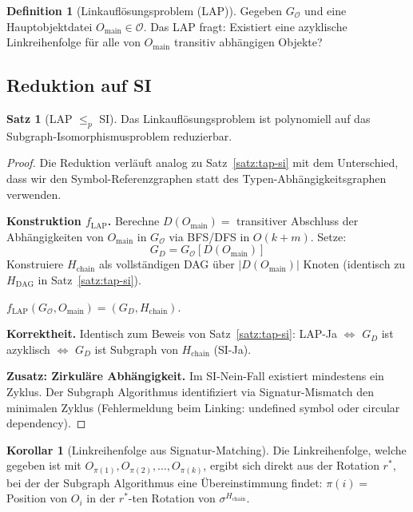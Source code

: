 ﻿\documentclass[a4paper,12pt]{article}
\theoremstyle{definition}
\newtheorem{definition}{Definition}
\newtheorem{satz}{Satz}
\newtheorem{korollar}{Korollar}
\begin{document}
\begin{definition}[Linkauflösungsproblem (LAP)]
\label{def:lap}
Gegeben $G_{\mathcal{O}}$ und eine Hauptobjektdatei $O_{\text{main}} \in \mathcal{O}$. Das LAP fragt: Existiert eine azyklische Linkreihenfolge für alle von $O_{\text{main}}$ transitiv abhängigen Objekte?
\end{definition}

\subsection{Reduktion auf SI}

\begin{satz}[LAP $\leq_p$ SI]
\label{satz:lap-si}
Das Linkauflösungsproblem ist polynomiell auf das Subgraph-Isomorphismusproblem reduzierbar.
\end{satz}

\begin{proof}
Die Reduktion verläuft analog zu Satz~\ref{satz:tap-si} mit dem Unterschied, dass wir den Symbol-Referenzgraphen statt des Typen-Abhängigkeitsgraphen verwenden.

\textbf{Konstruktion $f_{\text{LAP}}$.}
Berechne $D(O_{\text{main}}) = $ transitiver Abschluss der Abhängigkeiten von $O_{\text{main}}$ in $G_{\mathcal{O}}$ via BFS/DFS in $O(k + m)$. Setze:
\[
G_D = G_{\mathcal{O}}[D(O_{\text{main}})]
\]
Konstruiere $H_{\text{chain}}$ als vollständigen DAG über $|D(O_{\text{main}})|$ Knoten (identisch zu $H_{\text{DAG}}$ in Satz~\ref{satz:tap-si}).

$f_{\text{LAP}}(G_{\mathcal{O}}, O_{\text{main}}) = (G_D, H_{\text{chain}})$.

\textbf{Korrektheit.}
Identisch zum Beweis von Satz~\ref{satz:tap-si}: LAP-Ja $\Leftrightarrow$ $G_D$ ist azyklisch $\Leftrightarrow$ $G_D$ ist Subgraph von $H_{\text{chain}}$ (SI-Ja).

\textbf{Zusatz: Zirkuläre Abhängigkeit.}
Im SI-Nein-Fall existiert mindestens ein Zyklus. Der Subgraph Algorithmus identifiziert via Signatur-Mismatch den minimalen Zyklus (Fehlermeldung beim Linking: undefined symbol oder circular dependency).
\end{proof}

\begin{korollar}[Linkreihenfolge aus Signatur-Matching]
Die Linkreihenfolge, welche gegeben ist mit $O_{\pi(1)}, O_{\pi(2)}, \ldots, O_{\pi(k)}$, ergibt sich direkt aus der Rotation $r^*$, bei der der Subgraph Algorithmus eine Übereinstimmung findet: $\pi(i) = $ Position von $O_i$ in der $r^*$-ten Rotation von $\sigma^{H_{\text{chain}}}$.
\end{korollar}
\end{document}

